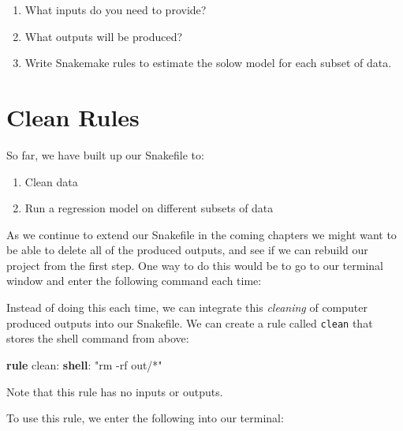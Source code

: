 \documentclass[]{book}
\newenvironment{Shaded}{\begin{snugshade}}{\end{snugshade}}
\newcommand{\KeywordTok}[1]{\textcolor[rgb]{0.13,0.29,0.53}{\textbf{{#1}}}}
\newcommand{\StringTok}[1]{\textcolor[rgb]{0.31,0.60,0.02}{{#1}}}
\newcommand{\NormalTok}[1]{{#1}}
\providecommand{\tightlist}{%
  \setlength{\itemsep}{0pt}\setlength{\parskip}{0pt}}
\theoremstyle{definition}
\theoremstyle{definition}
\theoremstyle{definition}
\theoremstyle{remark}
\begin{document}
\begin{enumerate}
\def\labelenumi{\arabic{enumi}.}
\tightlist
\item
  What inputs do you need to provide?
\item
  What outputs will be produced?
\item
  Write Snakemake rules to estimate the solow model for each subset of
  data.
\end{enumerate}

\section{Clean Rules}\label{clean-rules}

So far, we have built up our Snakefile to:

\begin{enumerate}
\def\labelenumi{\arabic{enumi}.}
\tightlist
\item
  Clean data
\item
  Run a regression model on different subsets of data
\end{enumerate}

As we continue to extend our Snakefile in the coming chapters we might
want to be able to delete all of the produced outputs, and see if we can
rebuild our project from the first step. One way to do this would be to
go to our terminal window and enter the following command each time:

\begin{Shaded}
\end{Shaded}

Instead of doing this each time, we can integrate this \emph{cleaning}
of computer produced outputs into our Snakefile. We can create a rule
called \texttt{clean} that stores the shell command from above:

\begin{Shaded}
\begin{Highlighting}[]
\KeywordTok{rule} \NormalTok{clean:}
    \KeywordTok{shell}\NormalTok{:}
        \StringTok{"rm -rf out/*"}
\end{Highlighting}
\end{Shaded}

Note that this rule has no inputs or outputs.

To use this rule, we enter the following into our terminal:
\end{document}
